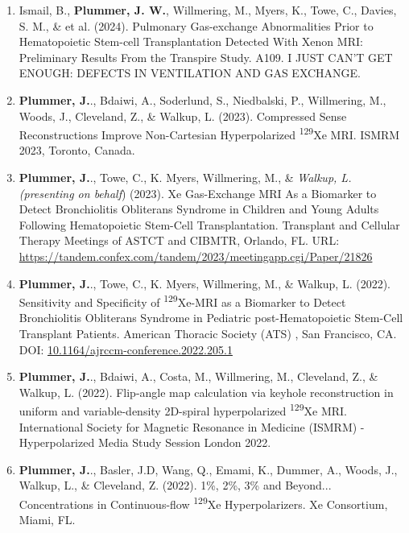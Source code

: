 \documentclass[12pt,]{scrartcl}
\begin{document}
\begin{enumerate}
  \leftskip-0.13in %

  \item Ismail, B., \textbf{Plummer, J. W.}, Willmering, M., Myers, K., Towe, C., Davies, S. M., \& et al. (2024). Pulmonary Gas-exchange Abnormalities Prior to Hematopoietic Stem-cell Transplantation Detected With Xenon MRI: Preliminary Results From the Transpire Study. A109. I JUST CAN'T GET ENOUGH: DEFECTS IN VENTILATION AND GAS EXCHANGE.
  
  \item \textbf{Plummer, J.}., Bdaiwi, A., Soderlund, S., Niedbalski, P., Willmering, M., Woods, J., Cleveland, Z., \& Walkup, L. (2023). Compressed Sense Reconstructions Improve Non-Cartesian Hyperpolarized \textsuperscript{129}Xe MRI. ISMRM 2023, Toronto, Canada.
  
  \item \textbf{Plummer, J.}., Towe, C., K. Myers, Willmering, M., \&  \textit{Walkup, L. (presenting on behalf}) (2023). Xe Gas-Exchange MRI As a Biomarker to Detect Bronchiolitis Obliterans Syndrome in Children and Young Adults Following Hematopoietic Stem-Cell Transplantation. Transplant and Cellular Therapy Meetings of ASTCT and CIBMTR, Orlando, FL. URL: \href{https://tandem.confex.com/tandem/2023/meetingapp.cgi/Paper/21826}{https://tandem.confex.com/tandem/2023/meetingapp.cgi/Paper/21826}
  
  \item \textbf{Plummer, J.}., Towe, C., K. Myers, Willmering, M., \& Walkup, L. (2022). Sensitivity and Specificity of \textsuperscript{129}Xe-MRI as a Biomarker to Detect Bronchiolitis Obliterans Syndrome in Pediatric post-Hematopoietic Stem-Cell Transplant Patients. American Thoracic Society (ATS) , San Francisco, CA. DOI: \href{https://www.atsjournals.org/doi/abs/10.1164/ajrccm-conference.2022.205.1_MeetingAbstracts.A2181}{10.1164/ajrccm-conference.2022.205.1}
  
  \item \textbf{Plummer, J.}., Bdaiwi, A., Costa, M., Willmering, M., Cleveland, Z., \& Walkup, L. (2022). Flip-angle map calculation via keyhole reconstruction in uniform and variable-density 2D-spiral hyperpolarized \textsuperscript{129}Xe MRI. International Society for Magnetic Resonance in Medicine (ISMRM) - Hyperpolarized Media Study Session London 2022.
  
  \item \textbf{Plummer, J.}., Basler, J.D, Wang, Q., Emami, K., Dummer, A., Woods, J., Walkup, L., \& Cleveland, Z. (2022). 1\%, 2\%, 3\% and Beyond... Concentrations in Continuous-flow \textsuperscript{129}Xe Hyperpolarizers. Xe Consortium, Miami, FL.
  

\end{enumerate}
\end{document}
